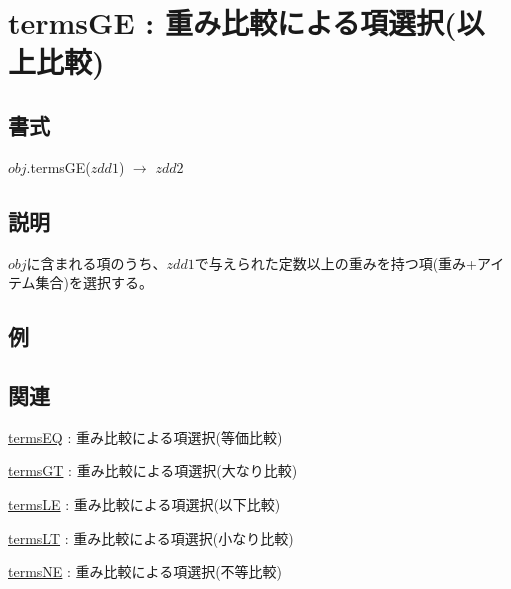 
\section{termsGE : 重み比較による項選択(以上比較)\label{sect:termsGE}}
\subsection*{書式}
$obj$.termsGE($zdd1$) $\rightarrow$ $zdd2$

\subsection*{説明}
$obj$に含まれる項のうち、$zdd1$で与えられた定数以上の重みを持つ項(重み+アイテム集合)を選択する。

\subsection*{例}


\subsection*{関連}
\hyperref[sect:termsEQ]{termsEQ} : 重み比較による項選択(等価比較)

\hyperref[sect:termsGT]{termsGT} : 重み比較による項選択(大なり比較)

\hyperref[sect:termsLE]{termsLE} : 重み比較による項選択(以下比較)

\hyperref[sect:termsLT]{termsLT} : 重み比較による項選択(小なり比較)

\hyperref[sect:termsNE]{termsNE} : 重み比較による項選択(不等比較)

